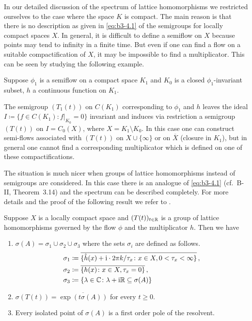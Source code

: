 	
	In our detailed discussion of the spectrum of lattice homomorphisms we restricted ourselves to the case where the space $K$ is compact.
	The main reason is that there is no description as given in \eqref{eq:b3-4.1} of the semigroups for locally compact spaces $X$.
	In general, it is difficult to define a semiflow on $X$ because points may tend to infinity in a finite time.
	But even if one can find a flow on a suitable compactification of $X$, it may be impossible to find a multiplicator.
	This can be seen by studying the following example.
	
	Suppose $\phi_{1}$ is a semiflow on a compact space $K_{1}$ and $K_{0}$ is a closed $\phi_{1}$-invariant subset, $h$ a continuous function on $K_{1}$.

    The semigroup $(T_{1}(t))$ on $C(K_{1})$ corresponding to $\phi_{1}$ and $h$ leaves the ideal $I \coloneq \{f \in C(K_{1}) \colon f|_{K_{0}} = 0\}$ invariant and induces via restriction a semigroup $(T(t))$ on $I = C_{0}(X)$, where $X = K_{1} \setminus K_{0}$.
    In this case one can construct semi-flows associated with $(T(t))$ on $X\cup\{\infty\}$ or on $\overline{X}$ (closure in $K_{1}$), but in general one cannot find a corresponding multiplicator which is defined on one of these compactifications.

The situation is much nicer when groups of lattice homomorphisms instead of semigroups are considered.
In this case there is an analogue of \eqref{eq:b3-4.1} (cf.\ B-II, Theorem~3.14) and the spectrum can be described completely.
For more details and the proof of the following result we refer to \citet{arendtgreiner:1984}.
\begin{theorem}\label{thm:b3-4.11}
	Suppose $X$ is a locally compact space and $(T(t))_{t\in\mathbb{R}}$ is a group of lattice homomorphisms governed by the flow $\phi$ and the multiplicator $h$.
	Then we have
	\begin{enumerate}[\upshape (i)]
		\item 
		$\sigma(A) = \sigma_{1}\cup\sigma_{2}\cup\sigma_{3}$ where the sets $\sigma_{i}$ are defined as follows.
		\[\begin{aligned}
			\sigma_{1} &\coloneq \overline{\{\hat{h}(x) + \mathrm{i}\cdot 2\pi k/\tau_{x} \colon x \in X, 0 < \tau_{x} < \infty\}}\,,\\
			\sigma_{2} &\coloneq \overline{\{h(x) \colon x \in X, \tau_{x} = 0\}}\,, \\
			\sigma_{3} &\coloneq \{\lambda \in \mathbb{C} \colon \lambda + \mathrm{i}\mathbb{R} \subseteq \sigma(A)\}
		\end{aligned}\]
		
		\item 
		$\sigma(T(t)) = \overline{\exp(t\sigma(A))}$ for every $t \geq 0$.
		
		\item 
		Every isolated point of $\sigma(A)$ is a first order pole of the resolvent.
	\end{enumerate}
\end{theorem}

